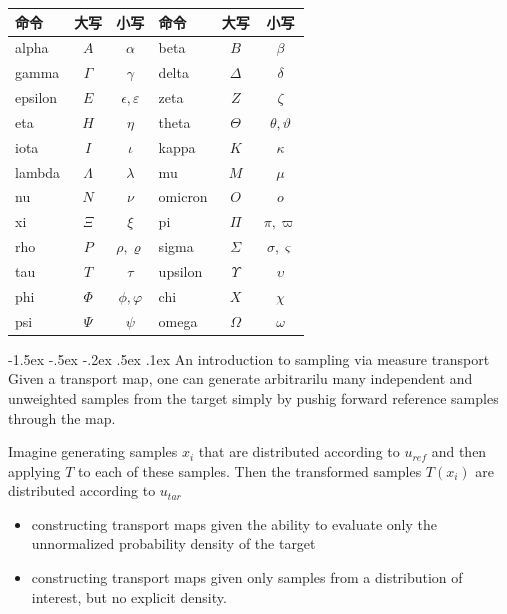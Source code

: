 \documentclass[a4paper, 11pt]{article}
\makeatletter
\newcommand{\sihao}{\fontsize{14pt}{\baselineskip}\selectfont}
\renewcommand\section{\@startsection{section}{1}{\z@}%
{-1.5ex \@plus -.5ex \@minus -.2ex}%
{.5ex \@plus .1ex}%
{\normalfont\sihao\CJKfamily{hei}}}
\makeatother
\begin{document}
\begin{CJK}{UTF8}{gbsn}
 \begin{tabular}{|lcc|lcc|}
\hline
命令 & 大写 & 小写 & 命令 & 大写 & 小写 \\
\hline
  alpha & $A$ & $\alpha$ &  beta & $B$ &$\beta$  \\
  gamma & $\Gamma$ & $\gamma$  &  delta & $\Delta$ & $\delta$ \\
  epsilon & $E$ & $\epsilon,\varepsilon$ &  zeta & $Z$ & $\zeta$ \\
   eta & $H$ &$\eta$  &  theta & $\Theta$ & $\theta,\vartheta$ \\
  iota & $I$ & $\iota$ &   kappa & $K$ & $\kappa$ \\
  lambda & $\Lambda$ & $\lambda$  & mu & $M$ & $\mu$ \\
  nu & $N$ & $\nu$ & omicron & $O$ & $o$ \\
    xi & $\Xi$ & $\xi$  &   pi & $\Pi$ & $\pi,\varpi$ \\
    rho & $P$ & $\rho,\varrho$  &  sigma & $\Sigma$ & $\sigma,\varsigma$ \\
   tau & $T$ & $\tau$ &   upsilon & $\Upsilon$ & $\upsilon$ \\
  phi & $\Phi$ & $\phi,\varphi$ &  chi & $X$ & $\chi$ \\
  psi & $\Psi$ & $\psi$  &  omega & $\Omega$ &$\omega$ \\
\hline
\end{tabular}


\tableofcontents

\newpage

\section{An introduction to sampling via measure transport}
Given a transport map, one can generate arbitrarilu many
independent and unweighted samples from
the target simply by pushig forward reference
samples through the map.

Imagine generating samples $x_i$ that are
distributed according to $u_{ref}$ and then applying
$T$ to each of these samples. Then the
transformed samples $T(x_i)$ are distributed
according to $u_{tar}$


\begin{itemize}
\item constructing transport maps given the
ability to evaluate only the unnormalized
probability density of the target
\item constructing transport maps given only
samples from a distribution of interest, but
no explicit density.
\end{itemize}


\end{CJK}
\end{document}
